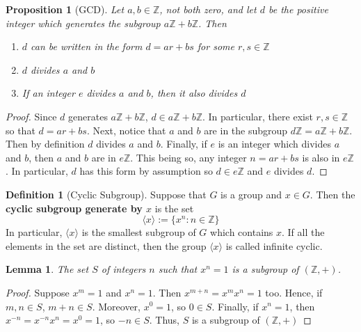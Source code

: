 \documentclass[12pt]{article}
\newtheorem{lem}[thm]{Lemma}  %
\newtheorem{prop}[thm]{Proposition}
\theoremstyle{definition}
\newtheorem{defn}[thm]{Definition}
\theoremstyle{remark}
\numberwithin{equation}{section}
\newcommand\Z{\mathbb Z}    %
\newcommand\B[1]{\textbf{ #1}}
\begin{document}
\begin{prop}[GCD]
        Let $a,b \in \Z$, not both zero, and let $d$ be the positive integer which generates the subgroup $a\Z + b\Z$. Then \begin{enumerate}
                \item $d$ can be written in the form $d = ar + bs$ for some $r,s \in \Z$
                \item $d$ divides $a$ and $b$
                \item If an integer $e$ divides $a$ and $b$, then it also divides $d$
        \end{enumerate}
\end{prop}
\begin{proof}
        Since $d$ generates $a\Z + b\Z$, $d \in a\Z + b\Z$. In particular, there exist $r,s \in \Z$ so that $d = ar + bs$. Next, notice that $a$ and $b$ are in the subgroup $d\Z = a\Z + b\Z$. Then by definition $d$ divides $a$ and $b$. Finally, if $e$ is an integer which divides $a$ and $b$, then $a$ and $b$ are in $e\Z$. This being so, any integer $n = ar+bs$ is also in $e\Z$. In particular, $d$ has this form by assumption so $d \in e\Z$ and $e$ divides $d$.
\end{proof}

\vspace{15pt}

\begin{defn}[Cyclic Subgroup]
        Suppose that $G$ is a group and $x \in G$. Then the \B{cyclic subgroup generate by $x$} is the set \begin{equation}
                \langle x \rangle := \{x^n: n \in \Z\}
        \end{equation}
        In particular, $\langle x \rangle$ is the smallest subgroup of $G$ which contains $x$. If all the elements in the set are distinct, then the group $\langle x \rangle$ is called infinite cyclic. 
\end{defn}

\vspace{15pt}

\begin{lem}
        The set $S$ of integers $n$ such that $x^n = 1$ is a subgroup of $(\Z,+)$.
\end{lem}
\begin{proof}
        Suppose $x^m = 1$ and $x^n = 1$. Then $x^{m+n} = x^mx^n = 1$ too. Hence, if $m,n \in S$, $m+n \in S$. Moreover, $x^0 = 1$, so $0 \in S$. Finally, if $x^n = 1$, then $x^{-n} = x^{-n}x^n = x^0 = 1$, so $-n \in S$. Thus, $S$ is a subgroup of $(\Z,+)$
\end{proof}
\end{document}
